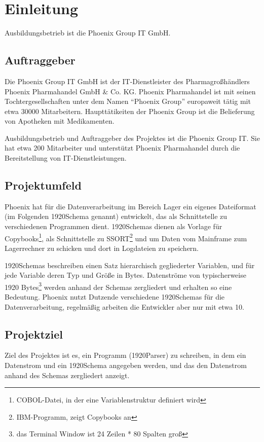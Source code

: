 \section{Einleitung}
\label{sec:Einleitung}
Ausbildungsbetrieb ist die Phoenix Group IT GmbH.

\subsection{Auftraggeber}
\label{sec:Auftraggeber}

Die Phoenix Group IT GmbH ist der IT-Dienstleister des Pharmagroßhändlers Phoenix Pharmahandel
GmbH \& Co. KG. Phoenix Pharmahandel ist mit seinen Tochtergesellschaften unter dem Namen ``Phoenix Group'' europaweit tätig mit etwa 30000 Mitarbeitern. Haupttätikeiten der Phoenix Group ist die Belieferung von Apotheken mit Medikamenten.

Ausbildungsbetrieb und Auftraggeber des Projektes ist die Phoenix Group IT. Sie hat etwa 200 Mitarbeiter und unterstützt Phoenix Pharmahandel durch die Bereitstellung von IT-Dienstleistungen.

\subsection{Projektumfeld} 
\label{sec:Projektumfeld}
Phoenix hat für die Datenverarbeitung im Bereich Lager ein eigenes Dateiformat (im Folgenden 1920Schema genannt) entwickelt, das als Schnittstelle zu verschiedenen Programmen dient. 1920Schemas dienen als Vorlage für Copybooks\footnote{COBOL-Datei, in der eine Variablenstruktur definiert wird}, als Schnittstelle zu SSORT\footnote{IBM-Programm, zeigt Copybooks an} und um Daten vom Mainframe zum Lagerrechner zu schicken und dort in Logdateien zu speichern.

1920Schemas beschreiben einen Satz hierarchisch gegliederter Variablen, und für jede Variable deren Typ und Größe in Bytes. Datenströme von typischerweise 1920 Bytes\footnote{das Terminal Window ist 24 Zeilen * 80 Spalten groß} werden anhand der Schemas zergliedert und erhalten so eine Bedeutung. Phoenix nutzt Dutzende verschiedene 1920Schemas für die Datenverarbeitung, regelmäßig arbeiten die Entwickler aber nur mit etwa 10.

\subsection{Projektziel} 
\label{sec:Projektziel}
Ziel des Projektes ist es, ein Programm (1920Parser) zu schreiben, in dem ein Datenstrom und ein 1920Schema angegeben werden, und das den Datenstrom anhand des Schemas zergliedert anzeigt.


